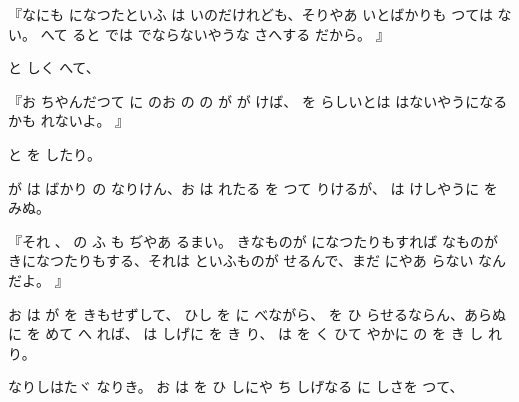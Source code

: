『なにも
になつたといふ
は
いのだけれども、そりやあ
いとばかりも
つては
ない。
へて
ると
では
でならないやうな
さへする
だから。
』

と
しく
へて、

『お
ちやんだつて
に
のお
の
の
が
が
けば、
を
らしいとは
はないやうになるかも
れないよ。
』

と
を
したり。

が
は
ばかり
の
なりけん、お
は
れたる
を
つて
りけるが、
は
けしやうに
を
みぬ。

『それ
、
の
ふ
も
ぢやあ
るまい。
きなものが
になつたりもすれば
なものが
きになつたりもする、それは
といふものが
せるんで、まだ
にやあ
らない
なんだよ。
』

お
は
が
を
きもせずして、
ひし
を
に
べながら、
を
ひ
らせるならん、あらぬ
に
を
めて
へ
れば、
は
しげに
を
き
り、
は
を
く
ひて
やかに
の
を
き
し
れり。

なりしはたヾ
なりき。
お
は
を
ひ
しにや
ち
しげなる
に
しさを
つて、

